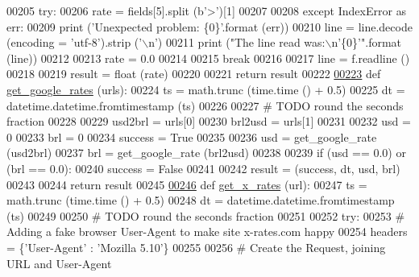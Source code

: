 \begin{DoxyCode}
{{{00205             \textcolor{keywordflow}{try}:
00206                 rate = fields[5].split (b\textcolor{stringliteral}{'>'})[1]
00207                 
00208             \textcolor{keywordflow}{except} IndexError \textcolor{keyword}{as} err:
00209                 \textcolor{keywordflow}{print} (\textcolor{stringliteral}{'Unexpected problem: \{0\}'}.format (err))
00210                 line = line.decode (encoding = \textcolor{stringliteral}{'utf-8'}).strip (\textcolor{stringliteral}{'\(\backslash\)n'})
00211                 \textcolor{keywordflow}{print} (\textcolor{stringliteral}{"The line read was:\(\backslash\)n'\{0\}'"}.format (line))
00212                 
00213                 rate = 0.0
00214             
00215             \textcolor{keywordflow}{break}
00216             
00217         line = f.readline ()
00218     
00219     result = float (rate)
00220     
00221     \textcolor{keywordflow}{return} result
00222     
\hypertarget{exch2exch_8py_source.tex_l00223}{}\hyperlink{namespaceexch2exch_ae0891a93a4a9cfe932011afddd41808d}{00223} \textcolor{keyword}{def }\hyperlink{namespaceexch2exch_ae0891a93a4a9cfe932011afddd41808d}{get\_google\_rates} (urls):
00224     ts = math.trunc (time.time () + 0.5)
00225     dt = datetime.datetime.fromtimestamp (ts)
00226     
00227     \textcolor{comment}{# TODO round the seconds fraction}
00228     
00229     usd2brl = urls[0]
00230     brl2usd = urls[1]
00231     
00232     usd = 0
00233     brl = 0
00234     success = \textcolor{keyword}{True}
00235     
00236     usd = get\_google\_rate (usd2brl)
00237     brl = get\_google\_rate (brl2usd)
00238     
00239     \textcolor{keywordflow}{if} (usd == 0.0) \textcolor{keywordflow}{or} (brl == 0.0):
00240         success = \textcolor{keyword}{False} 
00241         
00242     result = (success, dt, usd, brl)
00243     
00244     \textcolor{keywordflow}{return} result
00245         
\hypertarget{exch2exch_8py_source.tex_l00246}{}\hyperlink{namespaceexch2exch_a928a1249a810cfd0ec5fca3ec8f764fb}{00246} \textcolor{keyword}{def }\hyperlink{namespaceexch2exch_a928a1249a810cfd0ec5fca3ec8f764fb}{get\_x\_rates} (url):
00247     ts = math.trunc (time.time () + 0.5)
00248     dt = datetime.datetime.fromtimestamp (ts)
00249     
00250     \textcolor{comment}{# TODO round the seconds fraction}
00251     
00252     \textcolor{keywordflow}{try}:
00253         \textcolor{comment}{# Adding a fake browser User-Agent to make site x-rates.com happy}
00254         headers = \{\textcolor{stringliteral}{'User-Agent'} : \textcolor{stringliteral}{'Mozilla 5.10'}\}
00255             
00256         \textcolor{comment}{# Create the Request, joining URL and User-Agent}
}}}
\end{DoxyCode}
